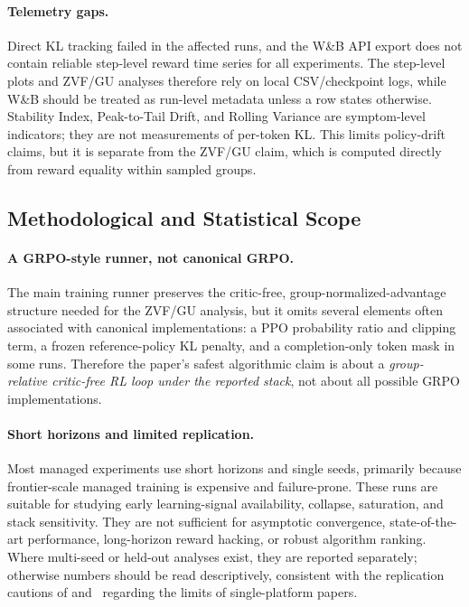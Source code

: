 \paragraph{Telemetry gaps.}
Direct KL tracking failed in the affected runs, and the W\&B API export does
not contain reliable step-level reward time series for all experiments.  The
step-level plots and ZVF/GU analyses therefore rely on local CSV/checkpoint
logs, while W\&B should be treated as run-level metadata unless a row states
otherwise.  Stability Index, Peak-to-Tail Drift, and Rolling Variance are
symptom-level indicators; they are not measurements of per-token
KL.  This limits policy-drift claims, but it is separate from the ZVF/GU claim,
which is computed directly from reward equality within sampled groups.

\subsection{Methodological and Statistical Scope}
\label{sec:method_limits}

\paragraph{A GRPO-style runner, not canonical GRPO.}
The main training runner preserves the critic-free, group-normalized-advantage
structure needed for the ZVF/GU analysis, but it omits several elements often
associated with canonical implementations: a PPO probability ratio and clipping
term, a frozen reference-policy KL penalty, and a completion-only token mask in
some runs.  Therefore the paper's safest algorithmic claim is about a
\emph{group-relative critic-free RL loop under the reported stack}, not about all
possible GRPO implementations.

\paragraph{Short horizons and limited replication.}
Most managed experiments use short horizons and single seeds, primarily because
frontier-scale managed training is expensive and failure-prone.  These runs are
suitable for studying early learning-signal availability, collapse, saturation,
and stack sensitivity.  They are not sufficient for asymptotic convergence,
state-of-the-art performance, long-horizon reward hacking, or robust algorithm
ranking.  Where multi-seed or held-out analyses exist, they are reported
separately; otherwise numbers should be read descriptively, consistent with the
replication cautions of \citet{henderson2018deep}
and~\citet{jordan2024benchmarking} regarding the limits of
single-platform papers.

